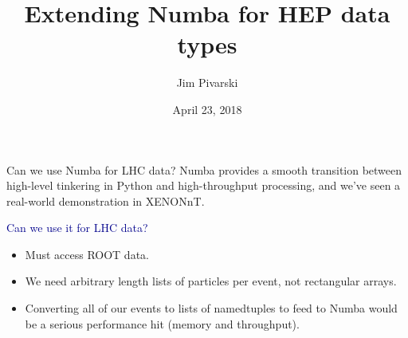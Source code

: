 \documentclass[aspectratio=169]{beamer}
\title[2018-04-23-dianahep-numba-oamap]{Extending Numba for HEP data types}
\author{Jim Pivarski}
\institute{Princeton University -- DIANA-HEP}
\date{April 23, 2018}
\begin{document}

\begin{frame}
  \titlepage
\end{frame}




\begin{frame}{Can we use Numba for LHC data?}
\vspace{0.5 cm}
Numba provides a smooth transition between high-level tinkering in Python and high-throughput processing, and we've seen a real-world demonstration in XENONnT.

\vspace{0.8 cm}
\textcolor{darkblue}{\Large Can we use it for LHC data?}

\vspace{0.2 cm}
\begin{itemize}
\item Must access ROOT data. 
\item We need arbitrary length lists of particles per event, not rectangular arrays.
\item Converting all of our events to lists of namedtuples to feed to Numba would be a serious performance hit (memory and throughput).

\vspace{0.2 cm}
\end{itemize}
\end{frame}
\end{document}
